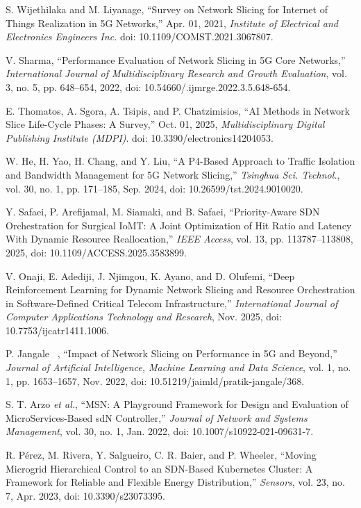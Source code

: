  S. Wijethilaka and M. Liyanage, ``Survey on Network Slicing for Internet of Things Realization in 5G Networks,'' Apr. 01, 2021, \emph{Institute of Electrical and Electronics Engineers Inc.} doi: 10.1109/COMST.2021.3067807.

 V. Sharma, ``Performance Evaluation of Network Slicing in 5G Core Networks,'' \emph{International Journal of Multidisciplinary Research and Growth Evaluation}, vol. 3, no. 5, pp. 648--654, 2022, doi: 10.54660/.ijmrge.2022.3.5.648-654.

 E. Thomatos, A. Sgora, A. Tsipis, and P. Chatzimisios, ``AI Methods in Network Slice Life-Cycle Phases: A Survey,'' Oct. 01, 2025, \emph{Multidisciplinary Digital Publishing Institute (MDPI)}. doi: 10.3390/electronics14204053.

 W. He, H. Yao, H. Chang, and Y. Liu, ``A P4-Based Approach to Traffic Isolation and Bandwidth Management for 5G Network Slicing,'' \emph{Tsinghua Sci. Technol.}, vol. 30, no. 1, pp. 171--185, Sep. 2024, doi: 10.26599/tst.2024.9010020.

 Y. Safaei, P. Arefijamal, M. Siamaki, and B. Safaei, ``Priority-Aware SDN Orchestration for Surgical IoMT: A Joint Optimization of Hit Ratio and Latency With Dynamic Resource Reallocation,'' \emph{IEEE Access}, vol. 13, pp. 113787--113808, 2025, doi: 10.1109/ACCESS.2025.3583899.

 V. Onaji, E. Adediji, J. Njimgou, K. Ayano, and D. Olufemi, ``Deep Reinforcement Learning for Dynamic Network Slicing and Resource Orchestration in Software-Defined Critical Telecom Infrastructure,'' \emph{International Journal of Computer Applications Technology and Research}, Nov. 2025, doi: 10.7753/ijcatr1411.1006.

 P. Jangale~ , ``Impact of Network Slicing on Performance in 5G and Beyond,'' \emph{Journal of Artificial Intelligence, Machine Learning and Data Science}, vol. 1, no. 1, pp. 1653--1657, Nov. 2022, doi: 10.51219/jaimld/pratik-jangale/368.

 S. T. Arzo \emph{et al.}, ``MSN: A Playground Framework for Design and Evaluation of MicroServices-Based sdN Controller,'' \emph{Journal of Network and Systems Management}, vol. 30, no. 1, Jan. 2022, doi: 10.1007/s10922-021-09631-7.

 R. Pérez, M. Rivera, Y. Salgueiro, C. R. Baier, and P. Wheeler, ``Moving Microgrid Hierarchical Control to an SDN-Based Kubernetes Cluster: A Framework for Reliable and Flexible Energy Distribution,'' \emph{Sensors}, vol. 23, no. 7, Apr. 2023, doi: 10.3390/s23073395.

